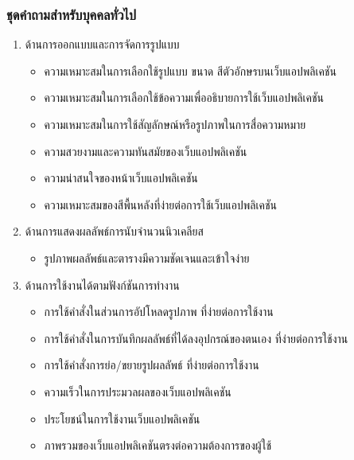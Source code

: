 \documentclass[12pt,oneside,openright,a4paper]{cpe-thai-project}
\begin{document}
\subsubsection{ชุดคำถามสำหรับบุคคลทั่วไป}
\begin{enumerate}
    \item ด้านการออกแบบและการจัดการรูปแบบ
    \begin{itemize}

        \item    ความเหมาะสมในการเลือกใช้รูปแบบ ขนาด สีตัวอักษรบนเว็บแอปพลิเคชัน
        \item    ความเหมาะสมในการเลือกใช้ข้อความเพื่ออธิบายการใช้เว็บแอปพลิเคชัน
        \item    ความเหมาะสมในการใช้สัญลักษณ์หรือรูปภาพในการสื่อความหมาย
        \item    ความสวยงามและความทันสมัยของเว็บแอปพลิเคชัน
        \item    ความน่าสนใจของหน้าเว็บแอปพลิเคชัน
        \item    ความเหมาะสมของสีพื้นหลังที่ง่ายต่อการใช้เว็บแอปพลิเคชัน 
    \end{itemize}
    \item ด้านการแสดงผลลัพธ์การนับจำนวนนิวเคลียส
    \begin{itemize}
        \item    รูปภาพผลลัพธ์และตารางมีความชัดเจนและเข้าใจง่าย
    \end{itemize}
    \item ด้านการใช้งานได้ตามฟังก์ชันการทำงาน
    \begin{itemize}
        \item    การใช้คำสั่งในส่วนการอัปโหลดรูปภาพ ที่ง่ายต่อการใช้งาน
        \item    การใช้คำสั่งในการบันทึกผลลัพธ์ที่ได้ลงอุปกรณ์ของตนเอง ที่ง่ายต่อการใช้งาน
        \item    การใช้คำสั่งการย่อ/ขยายรูปผลลัพธ์ ที่ง่ายต่อการใช้งาน
        \item    ความเร็วในการประมวลผลของเว็บแอปพลิเคชัน
        \item    ประโยชน์ในการใช้งานเว็บแอปพลิเคชัน
        \item    ภาพรวมของเว็บแอปพลิเคชันตรงต่อความต้องการของผู้ใช้
    \end{itemize}
\end{enumerate}
\end{document}
